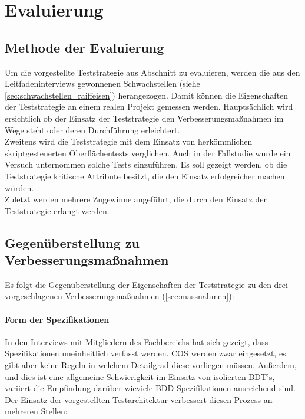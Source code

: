 \chapter{Evaluierung}
\label{sec:mbt_bdt}
\section{Methode der Evaluierung}
Um die vorgestellte Teststrategie aus Abschnitt \label{sec:mbt_bdt_concept} zu evaluieren, werden die aus den Leitfadeninterviews gewonnenen Schwachstellen (siehe \ref{sec:schwachstellen_raiffeisen}) herangezogen. Damit können die Eigenschaften der Teststrategie an einem realen Projekt gemessen werden. Hauptsächlich wird ersichtlich ob der Einsatz der Teststrategie den Verbesserungsmaßnahmen im Wege steht oder deren Durchführung erleichtert.\\
Zweitens wird die Teststrategie mit dem Einsatz von herkömmlichen skriptgesteuerten Oberflächentests verglichen. Auch in der Fallstudie wurde ein Versuch unternommen solche Tests einzuführen. Es soll gezeigt werden, ob die Teststrategie kritische Attribute besitzt, die den Einsatz erfolgreicher machen würden.\\
Zuletzt werden mehrere Zugewinne angeführt, die durch den Einsatz der Teststrategie erlangt werden.

\section{Gegenüberstellung zu Verbesserungsmaßnahmen}
Es folgt die Gegenüberstellung der Eigenschaften der Teststrategie zu den drei vorgeschlagenen Verbesserungsmaßnahmen (\ref{sec:massnahmen}):

\subsubsection{Form der Spezifikationen}
In den Interviews mit Mitgliedern des Fachbereichs hat sich gezeigt, dass Spezifikationen uneinheitlich verfasst werden. \Gls{COS} werden zwar eingesetzt, es gibt aber keine Regeln in welchem Detailgrad diese vorliegen müssen. Außerdem, und dies ist eine allgemeine Schwierigkeit im Einsatz von isolierten \Gls{BDT}'s, variiert die Empfindung darüber wieviele \Gls{BDD}-Spezifikationen ausreichend sind.\\ Der Einsatz der vorgestellten Testarchitektur verbessert diesen Prozess an mehreren Stellen:

